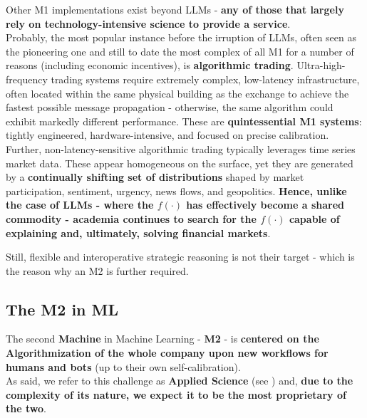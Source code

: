 \documentclass{article}
\begin{document}
Other M1 implementations exist beyond LLMs - \textbf{any of those that largely rely on technology-intensive science to provide a service}.\\

Probably, the most popular instance before the irruption of LLMs, often seen as the pioneering one and still to date the most complex of all M1 for a number of reasons (including economic incentives), is \textbf{algorithmic trading}. Ultra-high-frequency trading systems require extremely complex, low-latency infrastructure, often located within the same physical building as the exchange to achieve the fastest possible message propagation - otherwise, the same algorithm could exhibit markedly different performance. These are \textbf{quintessential M1 systems}: tightly engineered, hardware-intensive, and focused on precise calibration.\\

Further, non-latency-sensitive algorithmic trading typically leverages time series market data. These appear homogeneous on the surface, yet they are generated by a \textbf{continually shifting set of distributions} shaped by market participation, sentiment, urgency, news flows, and geopolitics. \textbf{Hence, unlike the case of LLMs - where the \begin{math} f(·)\end{math} has effectively become a shared commodity - academia continues to search for the \begin{math} f(·)\end{math} capable of explaining and, ultimately, solving financial markets}. 

Still, flexible and interoperative strategic reasoning is not their target - which is the reason why an M2 is further required.\\

\subsection{The M2 in ML}
\label{subsection: The M2 in ML}

The second \textbf{Machine} in Machine Learning - \textbf{M2} - is \textbf{centered on the Algorithmization of the whole company upon new workflows for humans and bots} (up to their own self-calibration).\\

As said, we refer to this challenge as \textbf{Applied Science} (see \cite{Advances in AI}) and, \textbf{due to the complexity of its nature, we expect it to be the most proprietary of the two}.\\
\end{document}
